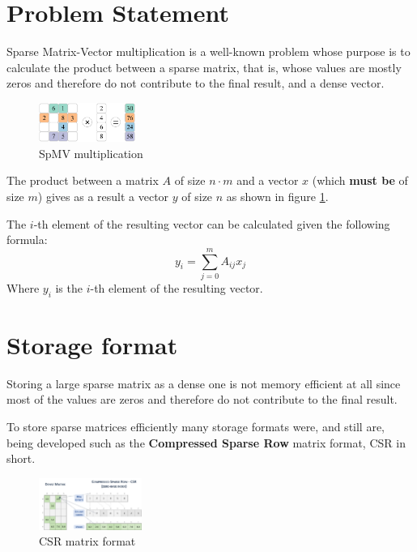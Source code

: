 \documentclass[conference]{IEEEtran}
\begin{document}
    \section{Problem Statement}

    Sparse Matrix-Vector multiplication is a well-known problem whose purpose
    is to calculate the product between a sparse matrix, that is, whose values
    are mostly zeros and therefore do not contribute to the final result, and a
    dense vector.

    \begin{figure}
        \includegraphics[width=0.28\textwidth]{spmv.png}
        \caption{SpMV multiplication}
        \label{fig:spmv}
    \end{figure}

    The product between a matrix $A$ of size $n \cdot m$ and a vector $x$
    (which \textbf{must be} of size $m$) gives as a result a vector $y$ of size
    $n$ as shown in figure \ref{fig:spmv}.

    The $i$-th element of the resulting vector can be calculated given the
    following formula:
    $$
    y_i = \sum\limits_{j = 0}^{m} A_{ij} x_j
    $$
    Where $y_i$ is the $i$-th element of the resulting vector.

    \section{Storage format}

    Storing a large sparse matrix as a dense one is not memory efficient at all
    since most of the values are zeros and therefore do not contribute to the
    final result.

    To store sparse matrices efficiently many storage formats were, and still
    are, being developed such as the \textbf{Compressed Sparse Row} matrix
    format, CSR in short.

    \begin{figure}
        \includegraphics[width=0.3\textwidth]{csr-format.png}
        \caption{CSR matrix format}
        \label{fig:csr-format}
    \end{figure}
\end{document}
